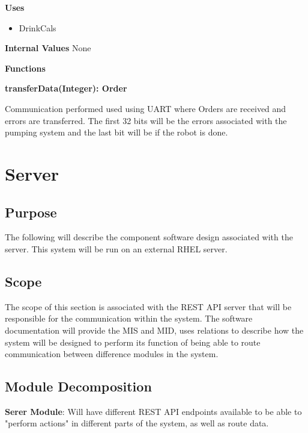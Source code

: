 \documentclass [10pt]{article}
\begin{document}
\textbf{Uses}

\begin{itemize}
	\item DrinkCals
\end{itemize}

\textbf{Internal Values}
 None

\textbf{Functions}

\textbf{transferData(Integer): Order}

Communication performed used using UART where Orders are received and errors are transferred. The first 32 bits will be the errors associated with the pumping system and the last bit will be if the robot is done.




\section {Server}


\subsection{Purpose}
The following will describe the component software design associated with the server. This system will be run on an external RHEL server.


\subsection{Scope}
The scope of this section is associated with the REST API server that will be responsible for the communication within the system. The software documentation will provide the MIS and MID, uses relations to describe how the system will be designed to perform its function of being able to route communication between difference modules in the system.


\subsection{Module Decomposition}
\textbf{Serer Module}: Will have different REST API endpoints available to be able to "perform actions" in different parts of the system, as well as route data.
\end{document}
